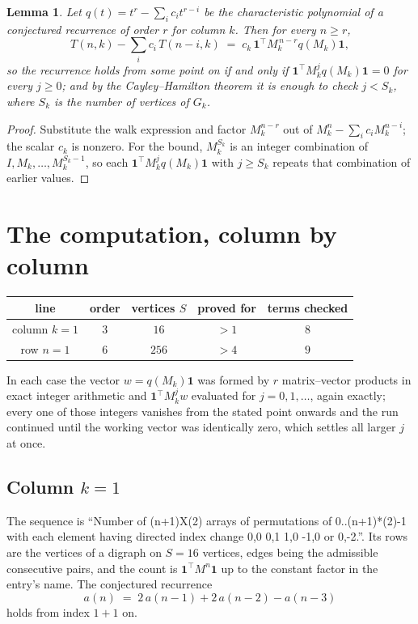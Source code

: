 \documentclass[11pt,a4paper]{article}
\theoremstyle{plain}
\newtheorem{lemma}[theorem]{Lemma}
\theoremstyle{definition}
\begin{document}
\begin{lemma}\label{lem:crit}
Let $q(t)=t^{r}-\sum_i c_it^{r-i}$ be the characteristic polynomial of a conjectured
recurrence of order $r$ for column $k$. Then for every $n\ge r$,
\[
T(n,k)-\sum_i c_i\,T(n-i,k)\;=\;c_k\,\mathbf{1}^{\!\top}M_k^{\,n-r}q(M_k)\mathbf{1},
\]
so the recurrence holds from some point on if and only if
$\mathbf{1}^{\!\top}M_k^{j}q(M_k)\mathbf{1}=0$ for every $j\ge0$; and by the
Cayley--Hamilton theorem it is enough to check $j<S_k$, where $S_k$ is the number of vertices
of $G_k$.
\end{lemma}

\begin{proof}
Substitute the walk expression and factor $M_k^{n-r}$ out of $M_k^{n}-\sum_ic_iM_k^{n-i}$;
the scalar $c_k$ is nonzero. For the bound, $M_k^{S_k}$ is an integer combination of
$I,M_k,\dots,M_k^{S_k-1}$, so each $\mathbf{1}^{\!\top}M_k^{j}q(M_k)\mathbf{1}$ with
$j\ge S_k$ repeats that combination of earlier values.
\end{proof}

\section{The computation, column by column}

\begin{center}
\begin{tabular}{ccccc}
line & order & vertices $S$ & proved for & terms checked \\ \hline
column $k$$=1$ & $3$ & $16$ & $>1$ & $8$ \\
row $n$$=1$ & $6$ & $256$ & $>4$ & $9$ \\
\end{tabular}
\end{center}

In each case the vector $w=q(M_k)\mathbf{1}$ was formed by $r$ matrix--vector products in
exact integer arithmetic and $\mathbf{1}^{\!\top}M_k^{j}w$ evaluated for $j=0,1,\dots$,
again exactly; every one of those integers vanishes from the stated point onwards and the run
continued until the working vector was identically zero, which settles all larger $j$ at once.

\subsection*{Column $k$$=1$}
The sequence is ``Number of (n+1)X(2) arrays of permutations of 0..(n+1)*(2)-1 with each element having directed index change 0,0 0,1 1,0 -1,0 or 0,-2.''. Its rows are the vertices of a digraph on
$S=16$ vertices, edges being the admissible consecutive pairs, and the count is
$\mathbf{1}^{\!\top}M^{n}\mathbf{1}$ up to the constant factor in the entry's name.
The conjectured recurrence
\[
a(n)\;=\;2\,a(n-1) + 2\,a(n-2) - a(n-3)
\]
holds from index $1+1$ on.
\end{document}
